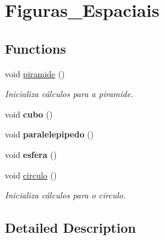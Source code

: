 \hypertarget{group__Figuras__Espaciais}{}\section{Figuras\+\_\+\+Espaciais}
\label{group__Figuras__Espaciais}
\subsection*{Functions}
\begin{DoxyCompactItemize}
\item 
void \hyperlink{group__Figuras__Espaciais_gae3945922f925bc3d1fd95c5dc4ff6987}{piramide} ()\hypertarget{group__Figuras__Espaciais_gae3945922f925bc3d1fd95c5dc4ff6987}{}\label{group__Figuras__Espaciais_gae3945922f925bc3d1fd95c5dc4ff6987}

\begin{DoxyCompactList}\small\item\em Inicializa cálculos para a piramide. \end{DoxyCompactList}\item 
void {\bfseries cubo} ()\hypertarget{group__Figuras__Espaciais_gaf0b7d023166ce6902197d4082a66ad03}{}\label{group__Figuras__Espaciais_gaf0b7d023166ce6902197d4082a66ad03}

\item 
void {\bfseries paralelepipedo} ()\hypertarget{group__Figuras__Espaciais_gaf5c3350f35c2d9ae97c0243b7aeac39e}{}\label{group__Figuras__Espaciais_gaf5c3350f35c2d9ae97c0243b7aeac39e}

\item 
void {\bfseries esfera} ()\hypertarget{group__Figuras__Espaciais_ga947bf2f326598c591bbdbf77a0280266}{}\label{group__Figuras__Espaciais_ga947bf2f326598c591bbdbf77a0280266}

\end{DoxyCompactItemize}
\begin{DoxyCompactItemize}
\item 
void \hyperlink{group__Figuras__Espaciais_ga28482bc381ce414df86e4fdb9e3e6da5}{circulo} ()
\begin{DoxyCompactList}\small\item\em Inicializa cálculos para o circulo. \end{DoxyCompactList}\end{DoxyCompactItemize}


\subsection{Detailed Description}



